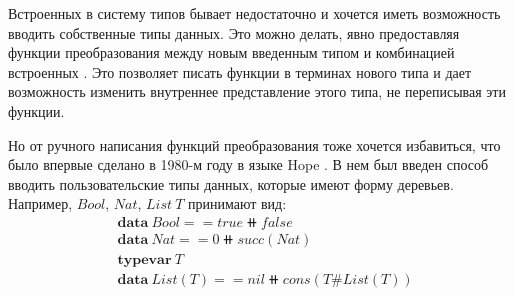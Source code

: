 Встроенных в систему типов бывает недостаточно и хочется иметь
возможность вводить собственные типы данных. Это можно делать, явно
предоставляя функции преобразования между новым введенным типом и
комбинацией встроенных
\cite{transformation-system-for-developing-recursive-programs}.
Это позволяет писать функции в терминах нового типа и дает возможность
изменить внутреннее представление этого типа, не переписывая эти функции.

Но от ручного написания функций преобразования тоже хочется избавиться,
что было впервые сделано в 1980-м году в языке Hope
\cite{hope-an-experimental-applicative-language}.
В нем был введен способ вводить пользовательские типы данных, которые имеют форму деревьев.
Например, \(Bool\), \(Nat\), \(List\ T\) принимают вид:
\begin{align*}
&\mathbf{data}\ Bool == true \doubleplus false\\
&\mathbf{data}\ Nat == 0 \doubleplus succ(Nat)\\
&\mathbf{typevar}\ T\\
&\mathbf{data}\ List(T) == nil \doubleplus cons(T \# List(T))
\end{align*}
